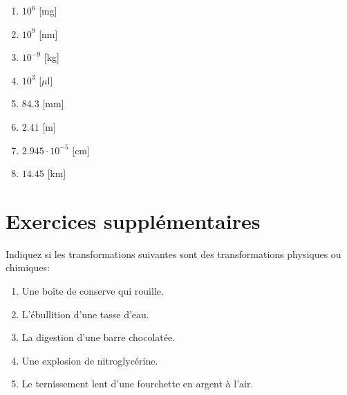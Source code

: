 \documentclass[
  11pt,
  a4paper,
  openany]{book}
\providecommand{\tightlist}{%
  \setlength{\itemsep}{0pt}\setlength{\parskip}{0pt}}
\begin{document}
\begin{Answer}

\begin{enumerate}
\def\labelenumi{\arabic{enumi}.}
\tightlist
\item
  \(10^{6}\) {[}mg{]}
\item
  \(10^{9}\) {[}nm{]}
\item
  \(10^{-9}\) {[}kg{]}
\item
  \(10^{3}\) {[}\(\mu\)l{]}
\item
  \(84.3\) {[}mm{]}
\item
  \(2.41\) {[}m{]}
\item
  \(2.945\cdot10^{-5}\) {[}cm{]}
\item
  \(14.45\) {[}km{]}
\end{enumerate}

\newpage

\end{Answer}

\section{Exercices supplémentaires}\label{exercices-suppluxe9mentaires}

\begin{Exercise}

Indiquez si les transformations suivantes sont des transformations physiques ou chimiques:

\begin{enumerate}
\def\labelenumi{\arabic{enumi}.}
\tightlist
\item
  Une boîte de conserve qui rouille.\\
\item
  L'ébullition d'une tasse d'eau.\\
\item
  La digestion d'une barre chocolatée.\\
\item
  Une explosion de nitroglycérine.\\
\item
  Le ternissement lent d'une fourchette en argent à l'air.
\end{enumerate}

\end{Exercise}
\end{document}

